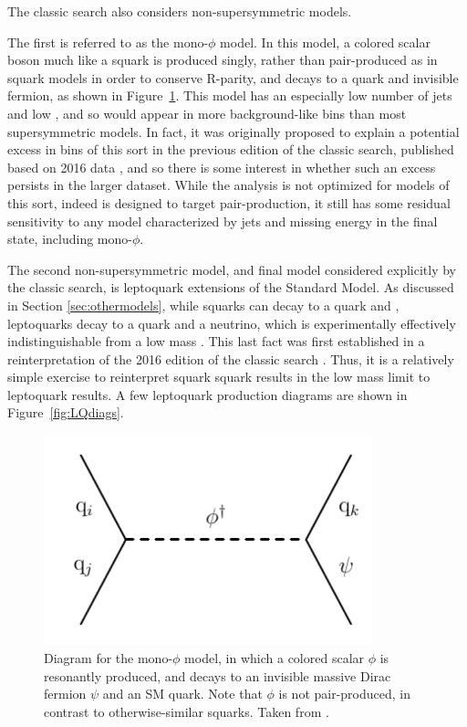     The classic search also considers non-supersymmetric models.

    The first is referred to as the mono-$\phi$ model.
    In this model, a colored scalar boson much like a squark is produced singly, rather than pair-produced as in squark models in order to conserve R-parity, and decays to a quark and invisible fermion, as shown in Figure~\ref{fig:monophidiag}.
    This model has an especially low number of jets and low \mttwo, and so would appear in more background-like bins than most supersymmetric models.
    In fact, it was originally proposed \cite{monophi} to explain a potential excess in bins of this sort in the previous edition of the classic search, published based on 2016 data \cite{MT2_2016}, and so there is some interest in whether such an excess persists in the larger dataset.
    While the analysis is not optimized for models of this sort, indeed \mttwo is designed to target pair-production, it still has some residual sensitivity to any model characterized by jets and missing energy in the final state, including mono-$\phi$.

    The second non-supersymmetric model, and final model considered explicitly by the classic search, is leptoquark extensions of the Standard Model.
    As discussed in Section \ref{sec:othermodels}, while squarks can decay to a quark and \lsp, leptoquarks decay to a quark and a neutrino, which is experimentally effectively indistinguishable from a low mass \lsp.
    This last fact was first established in a reinterpretation of the 2016 edition of the classic search \cite{LQ2016}.
    Thus, it is a relatively simple exercise to reinterpret squark squark results in the low mass \lsp limit to leptoquark results.
    A few leptoquark production diagrams are shown in Figure~\ref{fig:LQdiags}.

  \begin{figure}[h!]
    \centering
    \includegraphics[width=0.85\textwidth]{figures/MT2_2019/Figure_008.pdf}
    \caption[Diagram for the mono-$\phi$ model.]{Diagram for the mono-$\phi$ model, in which a colored scalar $\phi$ is resonantly produced, and decays to an invisible massive Dirac fermion $\psi$ and an SM quark. Note that $\phi$ is not pair-produced, in contrast to otherwise-similar squarks. Taken from \cite{MT2_2019}.}
    \label{fig:monophidiag}
  \end{figure}  

